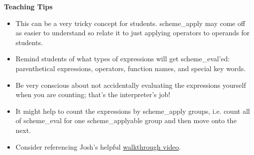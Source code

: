 \begin{blocksection}
\begin{guide}
\textbf{Teaching Tips}
\begin{itemize}
	\item This can be a very tricky concept for students. scheme\_apply may come off as easier to understand so relate it to just applying operators to operands for students.
	\item Remind students of what types of expressions will get scheme\_eval'ed: parenthetical expressions, operators, function names, and special key words.
	\item Be very conscious about not accidentally evaluating the expressions yourself when you are counting; that's the interpreter's job!
	\item It might help to count the expressions by scheme\_apply groups, i.e. count all of scheme\_eval for one scheme\_applyable group and then move onto the next.
	\item Consider referencing Josh's helpful \href{https://drive.google.com/file/d/1YH6eaOAzPx8MC0fO60bIbq9oZipC2lEd/view}{walkthrough video}.
\end{itemize}
\end{guide}
\end{blocksection}
